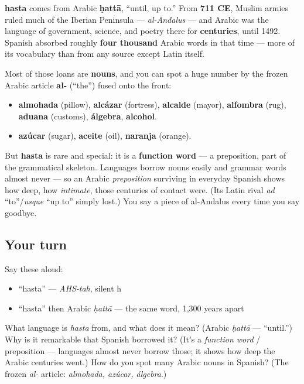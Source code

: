 \begin{cousinweb}
\textbf{hasta} comes from Arabic \textbf{ḥattā}, “until, up to.” From \textbf{711 CE}, Muslim armies ruled much of the Iberian Peninsula — \emph{al-Andalus} — and Arabic was the language of government, science, and poetry there for \textbf{centuries}, until 1492. Spanish absorbed roughly \textbf{four thousand} Arabic words in that time — more of its vocabulary than from any source except Latin itself.

Most of those loans are \textbf{nouns}, and you can spot a huge number by the frozen Arabic article \textbf{al-} (\textquotedblleft{}the\textquotedblright{}) fused onto the front:

\begin{itemize}
\raggedright
  \item \textbf{almohada} (pillow), \textbf{alcázar} (fortress), \textbf{alcalde} (mayor), \textbf{alfombra} (rug), \textbf{aduana} (customs), \textbf{álgebra}, \textbf{alcohol}.
  \item \textbf{azúcar} (sugar), \textbf{aceite} (oil), \textbf{naranja} (orange).
\end{itemize}

But \textbf{hasta} is rare and special: it is a \textbf{function word} — a preposition, part of the grammatical skeleton. Languages borrow nouns easily and grammar words almost never — so an Arabic \emph{preposition} surviving in everyday Spanish shows how deep, how \emph{intimate}, those centuries of contact were. (Its Latin rival \emph{ad} \textquotedblleft{}to\textquotedblright{}/\emph{usque} \textquotedblleft{}up to\textquotedblright{} simply lost.) You say a piece of al-Andalus every time you say goodbye.
\end{cousinweb}

\subsection*{Your turn}
Say these aloud:

\begin{itemize}
\raggedright
  \item \textquotedblleft{}hasta\textquotedblright{} — \emph{AHS-tah}, silent h
  \item \textquotedblleft{}hasta\textquotedblright{} then Arabic \emph{ḥattā} — the same word, 1,300 years apart
\end{itemize}

\begin{tcolorbox}[breakable,colback=teal!4,colframe=teal!35!black,title={Before you move on}]
What language is \emph{hasta} from, and what does it mean? (Arabic \emph{ḥattā} — \textquotedblleft{}until.\textquotedblright{}) Why is it remarkable that Spanish borrowed it? (It's a \emph{function word} / preposition — languages almost never borrow those; it shows how deep the Arabic centuries went.) How do you spot many Arabic nouns in Spanish? (The frozen \emph{al-} article: \emph{almohada, azúcar, álgebra}.)
\end{tcolorbox}
